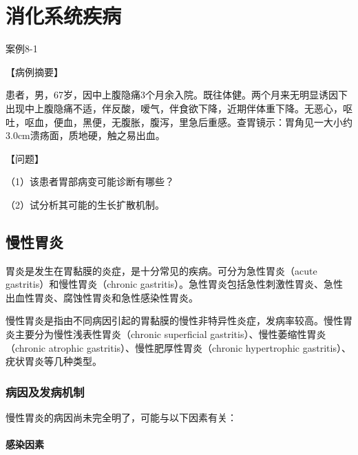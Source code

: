 \chapter{消化系统疾病}


\begin{framed}
{案例8-1}

{【病例摘要】}

患者，男，67岁，因中上腹隐痛3个月余入院。既往体健。两个月来无明显诱因下出现中上腹隐痛不适，伴反酸，嗳气，伴食欲下降，近期伴体重下降。无恶心，呕吐，呕血，便血，黑便，无腹胀，腹泻，里急后重感。查胃镜示：胃角见一大小约3.0cm溃疡面，质地硬，触之易出血。

{【问题】}

（1）该患者胃部病变可能诊断有哪些？

（2）试分析其可能的生长扩散机制。
\end{framed}

\section{慢性胃炎}

胃炎是发生在胃黏膜的炎症，是十分常见的疾病。可分为急性胃炎（acute
gastritis）和慢性胃炎（chronic
gastritis）。急性胃炎包括急性刺激性胃炎、急性出血性胃炎、腐蚀性胃炎和急性感染性胃炎。

慢性胃炎是指由不同病因引起的胃黏膜的慢性非特异性炎症，发病率较高。慢性胃炎主要分为慢性浅表性胃炎（chronic
superficial gastritis）、慢性萎缩性胃炎（chronic atrophic
gastritis）、慢性肥厚性胃炎（chronic hypertrophic
gastritis）、疣状胃炎等几种类型。

\subsection{病因及发病机制}

慢性胃炎的病因尚未完全明了，可能与以下因素有关：

\subsubsection{感染因素}

